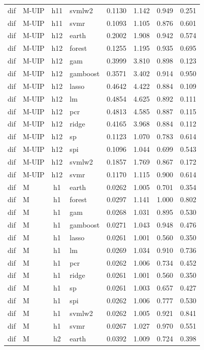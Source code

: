 \begin{ThreePartTable}
\begin{longtable}[t]{llclcccc}
dif & M-UIP & h11 & svmlw2 & 0.1130 & 1.142 & 0.949 & 0.251\\
dif & M-UIP & h11 & svmr & 0.1093 & 1.105 & 0.876 & 0.601\\
\addlinespace
dif & M-UIP & h12 & earth & 0.2002 & 1.908 & 0.942 & 0.574\\
dif & M-UIP & h12 & forest & 0.1255 & 1.195 & 0.935 & 0.695\\
dif & M-UIP & h12 & gam & 0.3999 & 3.810 & 0.898 & 0.123\\
dif & M-UIP & h12 & gamboost & 0.3571 & 3.402 & 0.914 & 0.950\\
dif & M-UIP & h12 & lasso & 0.4642 & 4.422 & 0.884 & 0.109\\
dif & M-UIP & h12 & lm & 0.4854 & 4.625 & 0.892 & 0.111\\
dif & M-UIP & h12 & pcr & 0.4813 & 4.585 & 0.887 & 0.115\\
dif & M-UIP & h12 & ridge & 0.4165 & 3.968 & 0.884 & 0.112\\
dif & M-UIP & h12 & sp & 0.1123 & 1.070 & 0.783 & 0.614\\
dif & M-UIP & h12 & spi & 0.1096 & 1.044 & 0.699 & 0.543\\
dif & M-UIP & h12 & svmlw2 & 0.1857 & 1.769 & 0.867 & 0.172\\
dif & M-UIP & h12 & svmr & 0.1170 & 1.115 & 0.900 & 0.614\\
\addlinespace
dif & M & h1 & earth & 0.0262 & 1.005 & 0.701 & 0.354\\
dif & M & h1 & forest & 0.0297 & 1.141 & 1.000 & 0.802\\
dif & M & h1 & gam & 0.0268 & 1.031 & 0.895 & 0.530\\
dif & M & h1 & gamboost & 0.0271 & 1.043 & 0.948 & 0.476\\
dif & M & h1 & lasso & 0.0261 & 1.001 & 0.560 & 0.350\\
dif & M & h1 & lm & 0.0269 & 1.034 & 0.910 & 0.736\\
dif & M & h1 & pcr & 0.0262 & 1.006 & 0.734 & 0.452\\
dif & M & h1 & ridge & 0.0261 & 1.001 & 0.560 & 0.350\\
dif & M & h1 & sp & 0.0261 & 1.003 & 0.657 & 0.427\\
dif & M & h1 & spi & 0.0262 & 1.006 & 0.777 & 0.530\\
dif & M & h1 & svmlw2 & 0.0262 & 1.005 & 0.921 & 0.841\\
dif & M & h1 & svmr & 0.0267 & 1.027 & 0.970 & 0.551\\
\addlinespace
dif & M & h2 & earth & 0.0392 & 1.009 & 0.724 & 0.398\\

\end{longtable}
\end{ThreePartTable}
